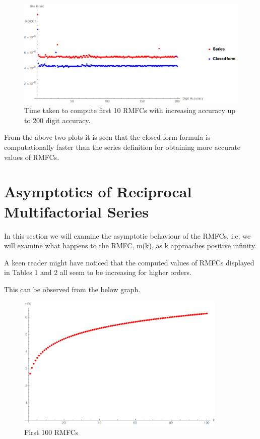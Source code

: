 \documentclass[12pt]{article}
\numberwithin{equation}{section}
\begin{document}
\begin{figure}[!hbp]
    \centering
    \includegraphics[width=13cm]{Images/first200digitsaccuracy.png}
    \caption{Time taken to compute first 10 RMFCs with increasing accuracy up to 200 digit accuracy.}
    \label{fig:timecomp10rmfc200digit}
\end{figure}\par
From the above two plots it is seen that the closed form formula is computationally faster than the series definition for obtaining more accurate values of RMFCs. 


\section{Asymptotics of Reciprocal Multifactorial Series}
\par In this section we will examine the asymptotic behaviour of the RMFCs, i.e. we will examine what happens to the RMFC, m(k), as k approaches positive infinity.
\par A keen reader might have noticed that the computed values of RMFCs displayed in Tables 1 and 2 all seem to be increasing for higher orders.
\par This can be observed from the below graph.
\begin{figure}[!hbp]
    \centering
    \includegraphics[width=10cm]{Images/first100RMFCs.png}
    \caption{First 100 RMFCs}
    \label{fig:first100rmfcs}
\end{figure}
\end{document}
